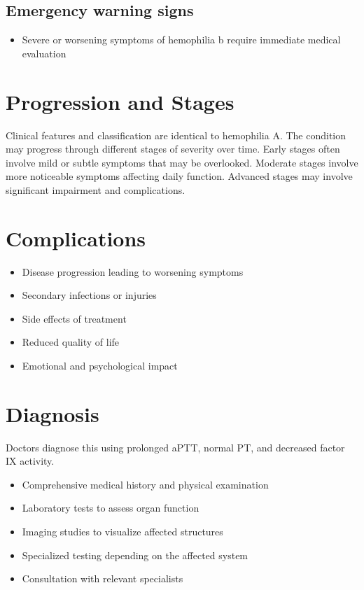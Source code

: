 \subsection{Emergency warning signs}
\begin{itemize}[noitemsep]
  \item Severe or worsening symptoms of hemophilia b require immediate medical evaluation
\end{itemize}
\section{Progression and Stages}
Clinical features and classification are identical to hemophilia A. The condition may progress through different stages of severity over time. Early stages often involve mild or subtle symptoms that may be overlooked. Moderate stages involve more noticeable symptoms affecting daily function. Advanced stages may involve significant impairment and complications.
\section{Complications}
\begin{itemize}[noitemsep]
  \item Disease progression leading to worsening symptoms
  \item Secondary infections or injuries
  \item Side effects of treatment
  \item Reduced quality of life
  \item Emotional and psychological impact
\end{itemize}
\section{Diagnosis}
Doctors diagnose this using prolonged aPTT, normal PT, and decreased factor IX activity.

\begin{itemize}[noitemsep]
  \item Comprehensive medical history and physical examination
  \item Laboratory tests to assess organ function
  \item Imaging studies to visualize affected structures
  \item Specialized testing depending on the affected system
  \item Consultation with relevant specialists
\end{itemize}
